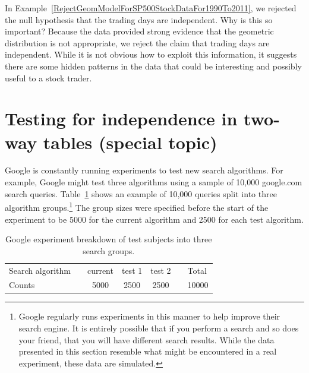 \begin{example}{In Example~\ref{RejectGeomModelForSP500StockDataFor1990To2011}, we rejected the null hypothesis that the trading days are independent. Why is this so important?}
Because the data provided strong evidence that the geometric distribution is not appropriate, we reject the claim that trading days are independent. While it is not obvious how to exploit this information, it suggests there are some hidden patterns in the data that could be interesting and possibly useful to a stock trader.
\end{example}




\section{Testing for independence in two-way tables (special topic)}
\label{twoWayTablesAndChiSquare}


Google is constantly running experiments to test new search algorithms. For example, Google might test three algorithms using a sample of 10,000 google.com search queries. Table~\ref{googleSearchAlgorithmByAlgorithmOnly} shows an example of 10,000 queries split into three algorithm groups.\footnote{Google regularly runs experiments in this manner to help improve their search engine. It is entirely possible that if you perform a search and so does your friend, that you will have different search results. While the data presented in this section resemble what might be encountered in a real experiment, these data are simulated.} The group sizes were specified before the start of the experiment to be 5000 for the current algorithm and 2500 for each test algorithm.

\begin{table}[h]
\centering
\begin{tabular}{ll ccc ll}
\hline
Search algorithm	 & \hspace{1mm} & current & test 1 & test 2 & \hspace{1mm} & Total \\
Counts &		& 5000 & 2500 & 2500 & & 10000 \\
\hline
\end{tabular}
\caption{Google experiment breakdown of test subjects into three search groups.}
\label{googleSearchAlgorithmByAlgorithmOnly}
\end{table}

